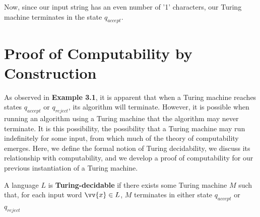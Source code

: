 \documentclass{article}
\begin{document}
\noindent Now, since our input string has an even number of '1' characters, our Turing machine terminates in the state $q_{accept}$. \cite{2}

\section{Proof of Computability by Construction}
As observed in \textbf{Example 3.1}, it is apparent that when a Turing machine reaches states $q_{accept}$ or $q_{reject}$, its algorithm will terminate.  However, it is possible when running an algorithm using a Turing machine that the algorithm may never terminate.  It is this possibility, the possibility that a Turing machine may run indefinitely for some input, from which much of the theory of computability emerges.  Here, we define the formal notion of Turing decidability, we discuss its relationship with computability, and we develop a proof of computability for our previous instantiation of a Turing machine.

\begin{defin}
	A language $L$ is \textbf{Turing-decidable} if there exists some Turing machine $M$ such that, for each input word $\vv{x} \in L$, $M$ terminates in either state $q_{accept}$ or $q_{reject}$ \cite{2}
\end{defin}
\end{document}
